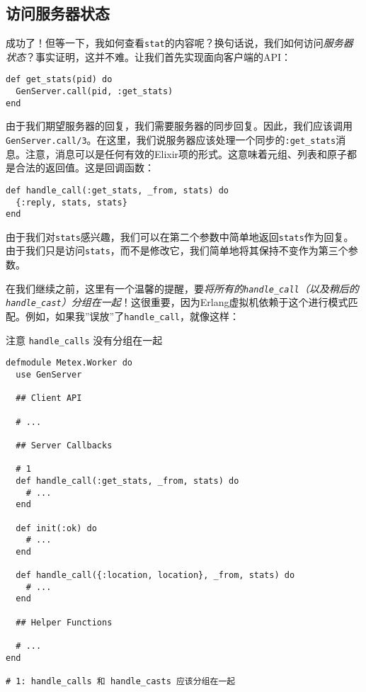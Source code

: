 \subsection{访问服务器状态}

成功了！但等一下，我如何查看\texttt{stat}的内容呢？换句话说，我们如何访问\emph{服务器状态}？事实证明，这并不难。让我们首先实现面向客户端的API：

\begin{code}{}
\begin{verbatim}
def get_stats(pid) do
  GenServer.call(pid, :get_stats)
end
\end{verbatim}
\end{code}

由于我们期望服务器的回复，我们需要服务器的同步回复。因此，我们应该调用\texttt{GenServer.call/3}。在这里，我们说服务器应该处理一个同步的\texttt{:get\_stats}消息。注意，消息可以是任何有效的Elixir项的形式。这意味着元组、列表和原子都是合法的返回值。这是回调函数：

\begin{code}{}
\begin{verbatim}
def handle_call(:get_stats, _from, stats) do
  {:reply, stats, stats}
end
\end{verbatim}
\end{code}

由于我们对\texttt{stats}感兴趣，我们可以在第二个参数中简单地返回\texttt{stats}作为回复。由于我们只是访问\texttt{stats}，而不是修改它，我们简单地将其保持不变作为第三个参数。

在我们继续之前，这里有一个温馨的提醒，要\emph{将所有的\texttt{handle\_call}（以及稍后的\texttt{handle\_cast}）分组在一起}！这很重要，因为Erlang虚拟机依赖于这个进行模式匹配。例如，如果我''误放''了\texttt{handle\_call}，就像这样：

\begin{code}{注意 \texttt{handle\_calls} 没有分组在一起}
\begin{verbatim}
defmodule Metex.Worker do
  use GenServer

  ## Client API

  # ...

  ## Server Callbacks

  # 1
  def handle_call(:get_stats, _from, stats) do
    # ...
  end

  def init(:ok) do
    # ...
  end

  def handle_call({:location, location}, _from, stats) do
    # ...
  end

  ## Helper Functions

  # ...
end

# 1: handle_calls 和 handle_casts 应该分组在一起
\end{verbatim}
\label{lst:note_handle_calls}
\end{code}

